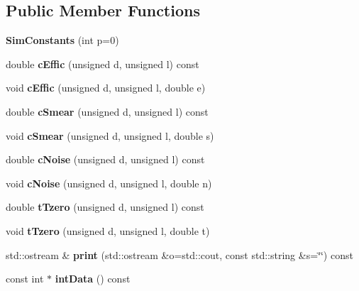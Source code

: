 \subsection*{Public Member Functions}
\begin{DoxyCompactItemize}
\item 
{\bfseries SimConstants} (int p=0)\label{classTBTrack_1_1SimConstants_ac985b42953f6a9db670ac9ebe4491dd3}

\item 
double {\bfseries cEffic} (unsigned d, unsigned l) const \label{classTBTrack_1_1SimConstants_a95b2a640d1fdf43d0e138df1c59097da}

\item 
void {\bfseries cEffic} (unsigned d, unsigned l, double e)\label{classTBTrack_1_1SimConstants_a57422e75c11ad31c3f76d5ed5357685f}

\item 
double {\bfseries cSmear} (unsigned d, unsigned l) const \label{classTBTrack_1_1SimConstants_a5ad8399a9a26ae1a2c8a143a0e34b54d}

\item 
void {\bfseries cSmear} (unsigned d, unsigned l, double s)\label{classTBTrack_1_1SimConstants_aef787d85563deecf9fcaf23130e1e6af}

\item 
double {\bfseries cNoise} (unsigned d, unsigned l) const \label{classTBTrack_1_1SimConstants_a05135b1be10f15e90b164c2aabd8ae1b}

\item 
void {\bfseries cNoise} (unsigned d, unsigned l, double n)\label{classTBTrack_1_1SimConstants_a206034df73ce2b627ca441e078abe2da}

\item 
double {\bfseries tTzero} (unsigned d, unsigned l) const \label{classTBTrack_1_1SimConstants_ac2537bcd88e2578122285edd4387ca1f}

\item 
void {\bfseries tTzero} (unsigned d, unsigned l, double t)\label{classTBTrack_1_1SimConstants_a326a04e3e174301b65c5d8a2605dc531}

\item 
std::ostream \& {\bfseries print} (std::ostream \&o=std::cout, const std::string \&s=\char`\"{}\char`\"{}) const \label{classTBTrack_1_1SimConstants_aa6e784ee0e469dd84e9ce779a0a627b4}

\item 
const int $\ast$ {\bfseries intData} () const \label{classTBTrack_1_1SimConstants_a84fb5877bd702e25394576f9b9b8853f}


\end{DoxyCompactItemize}
